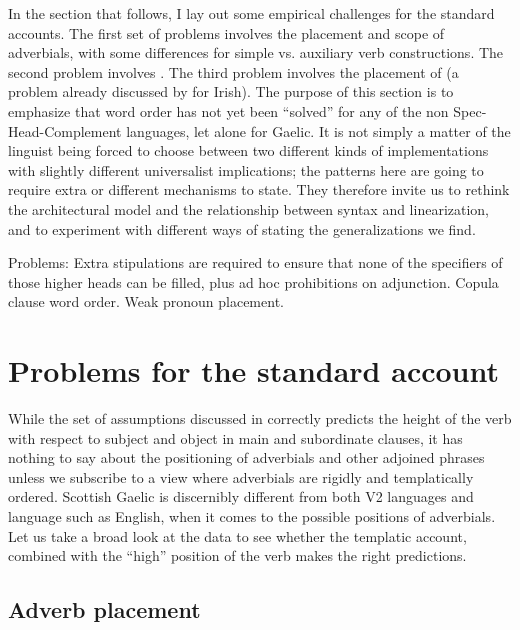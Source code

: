 \documentclass[output=paper,colorlinks,citecolor=brown]{langscibook}
\begin{document}
In the section that follows, I lay out some empirical challenges for the standard accounts. The first set of problems involves the placement and scope of adverbials, with some differences for simple vs. auxiliary verb constructions. The second problem involves . The third problem involves the placement of  (a problem already discussed by \citealt{bennettelfnermccloskey13} for Irish). The purpose of this section is to emphasize that word order has not yet been “solved” for any of the non Spec-Head-Complement languages, let alone for Gaelic. It is not simply a matter of the linguist being forced to choose between two different kinds of implementations with slightly different universalist implications; the patterns here are going to require extra or different mechanisms to state. They therefore invite us to rethink the architectural model and the relationship between syntax and linearization, and to experiment with different ways of stating the generalizations we find. 

\ea
Problems:
\ea Extra stipulations are required to ensure that none of the specifiers of those higher heads can be filled, plus ad hoc prohibitions on adjunction.
\ex Copula clause word order.
\ex Weak pronoun placement.
\z
\z

\section{Problems for the standard account}\label{sec:ramchand:3}

While the set of assumptions discussed in  correctly predicts the height of the verb with respect to subject and object in main and subordinate clauses, it has nothing to say about the positioning of adverbials and other adjoined phrases unless we subscribe to a view where adverbials are rigidly and templatically ordered.  Scottish Gaelic is discernibly different from both V2 languages and language such as English, when it comes to the possible  positions of adverbials. Let us take a broad look at the data to see whether the templatic account, combined with the  ``high'' position of the verb makes the right predictions. 



\subsection{Adverb placement}
\end{document}
